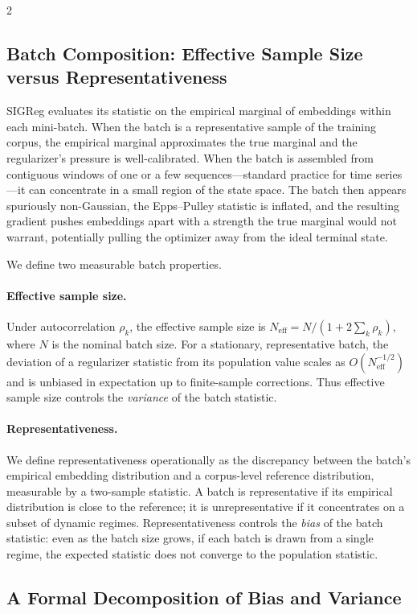 \documentclass[10pt]{article}
\theoremstyle{remark}
\begin{document}
\begin{multicols*}{2}
\subsection{Batch Composition: Effective Sample Size versus Representativeness}

SIGReg evaluates its statistic on the empirical marginal of embeddings within each mini-batch. When the batch is a representative sample of the training corpus, the empirical marginal approximates the true marginal and the regularizer's pressure is well-calibrated. When the batch is assembled from contiguous windows of one or a few sequences---standard practice for time series---it can concentrate in a small region of the state space. The batch then appears spuriously non-Gaussian, the Epps--Pulley statistic is inflated, and the resulting gradient pushes embeddings apart with a strength the true marginal would not warrant, potentially pulling the optimizer away from the ideal terminal state.

We define two measurable batch properties.

\paragraph{Effective sample size.}
Under autocorrelation $\rho_k$, the effective sample size is $N_{\mathrm{eff}} = N / (1 + 2\sum_k \rho_k)$, where $N$ is the nominal batch size. For a stationary, representative batch, the deviation of a regularizer statistic from its population value scales as $O(N_{\mathrm{eff}}^{-1/2})$ and is unbiased in expectation up to finite-sample corrections. Thus effective sample size controls the \emph{variance} of the batch statistic.

\paragraph{Representativeness.}
We define representativeness operationally as the discrepancy between the batch's empirical embedding distribution and a corpus-level reference distribution, measurable by a two-sample statistic. A batch is representative if its empirical distribution is close to the reference; it is unrepresentative if it concentrates on a subset of dynamic regimes. Representativeness controls the \emph{bias} of the batch statistic: even as the batch size grows, if each batch is drawn from a single regime, the expected statistic does not converge to the population statistic.

\subsection{A Formal Decomposition of Bias and Variance}


\end{multicols*}
\end{document}
